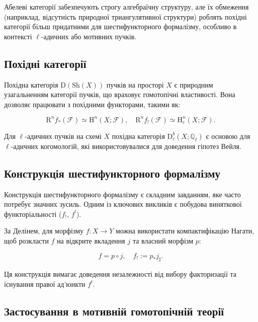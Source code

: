 \documentclass{article}
\begin{document}
\begin{remark}
Абелеві категорії забезпечують строгу алгебраїчну структуру, але їх обмеження (наприклад, відсутність природної триангулятивної структури) роблять похідні категорії більш придатними для шестифункторного формалізму, особливо в контексті \(\ell\)-адичних або мотивних пучків.
\end{remark}

\subsection{Похідні категорії}

Похідна категорія \( \mathrm{D}(\mathrm{Sh}(X)) \) пучків на просторі \( X \) є природним узагальненням категорії пучків, що враховує гомотопічні властивості. Вона дозволяє працювати з похідними функторами, такими як:

\[
\mathrm{R}^n f_*(\mathscr{F}) \simeq \mathrm{H}^n(X; \mathscr{F}), \quad \mathrm{R}^n f_!(\mathscr{F}) \simeq \mathrm{H}_c^n(X; \mathscr{F}).
\]

\begin{example}
Для \(\ell\)-адичних пучків на схемі \( X \) похідна категорія \( \mathrm{D}_c^b(X; \mathbb{Q}_\ell) \) є основою для \(\ell\)-адичних когомологій, які використовувалися для доведення гіпотез Вейля.
\end{example}

\subsection{Конструкція шестифункторного формалізму}

Конструкція шестифункторного формалізму є складним завданням, яке часто потребує значних зусиль. Одним із ключових викликів є побудова виняткової функторіальності (\( f_! \), \( f^! \)).

\begin{remark}
За Делінем, для морфізму \( f: X \to Y \) можна використати компактифікацію Нагати, щоб розкласти \( f \) на відкрите вкладення \( j \) та власний морфізм \( p \):

\[
f = p \circ j, \quad f_! := p_* j_\sharp.
\]

Ця конструкція вимагає доведення незалежності від вибору факторизації та існування правої ад’юнкти \( f^! \).
\end{remark}

\subsection{Застосування в мотивній гомотопічній теорії}
\end{document}
